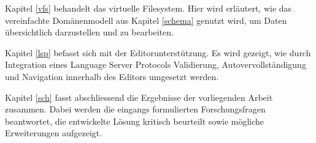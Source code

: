 Kapitel \ref{vfs}  behandelt das virtuelle Filesystem. Hier wird erläutert, wie das vereinfachte Domänenmodell aus Kapitel \ref{schema} genutzt wird, um Daten übersichtlich darzustellen und zu bearbeiten.

Kapitel \ref{lsp} befasst sich mit der Editorunterstützung. Es wird gezeigt, wie durch Integration eines Language Server Protocols Validierung, Autovervollständigung und Navigation innerhalb des Editors umgesetzt werden.

Kapitel \ref{sch} fasst abschliessend die Ergebnisse der vorliegenden Arbeit zusammen. Dabei werden die eingangs formulierten Forschungsfragen beantwortet, die entwickelte Lösung kritisch beurteilt sowie mögliche Erweiterungen aufgezeigt.




